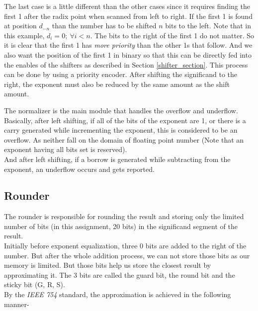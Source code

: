 \documentclass[14pt]{article}
\begin{document}
The last case is a little different than the other cases since it requires finding the first 1 after the radix point when scanned from left to right. If the first 1 is found at position $d_{-n}$ than the number has to be shifted $n$ bits to the left. Note that in this example, $d_i = 0;\ \forall i < n$. The bits to the right of the first 1 do not matter. So it is clear that the first 1 has \textit{more priority} than the other 1s that follow. And we also want the position of the first 1 in binary so that this can be directly fed into the enables of the shifters as described in Section \ref{shifter_section}. This process can be done by using a priority encoder. After shifting the significand to the right, the exponent must also be reduced by the same amount as the shift amount.

The normalizer is the main module that handles the overflow and underflow. Basically, after left shifting, if all of the bits of the exponent are 1, or there is a carry generated while incrementing the exponent, this is considered to be an overflow. As neither fall on the domain of floating point number (Note that an exponent having all bits set is reserved).\\

And after left shifting, if a borrow is generated while subtracting from the exponent, an underflow occurs and gets reported.

\subsection{Rounder}
The rounder is responsible for rounding the result and storing only the limited number of bits (in this assignment, 20 bits) in the significand segment of the result.\\
Initially before exponent equalization, three 0 bits are added to the right of the number. But after the whole addition process, we can not store those bits as our memory is limited. But those bits help us store the closest result by approximating it. The 3 bits are called the guard bit, the round bit and the sticky bit (G, R, S).\\

By the \textit{IEEE 754} standard, the approximation is achieved in the following manner-\\
\end{document}
